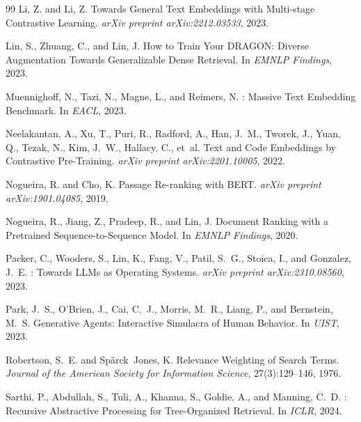 \documentclass[11pt]{article}
\begin{document}
\begin{thebibliography}{99}
Li, Z. and Li, Z.
\newblock Towards General Text Embeddings with Multi-stage Contrastive Learning.
\newblock \emph{arXiv preprint arXiv:2212.03533}, 2023.

Lin, S., Zhuang, C., and Lin, J.
\newblock How to Train Your {DRAGON}: Diverse Augmentation Towards Generalizable Dense
  Retrieval.
\newblock In \emph{EMNLP Findings}, 2023.

Muennighoff, N., Tazi, N., Magne, L., and Reimers, N.
: Massive Text Embedding Benchmark.
\newblock In \emph{EACL}, 2023.

Neelakantan, A., Xu, T., Puri, R., Radford, A., Han, J.~M., Tworek, J., Yuan, Q.,
  Tezak, N., Kim, J.~W., Hallacy, C., et~al.
\newblock Text and Code Embeddings by Contrastive Pre-Training.
\newblock \emph{arXiv preprint arXiv:2201.10005}, 2022.

Nogueira, R. and Cho, K.
\newblock Passage Re-ranking with {BERT}.
\newblock \emph{arXiv preprint arXiv:1901.04085}, 2019.

Nogueira, R., Jiang, Z., Pradeep, R., and Lin, J.
\newblock Document Ranking with a Pretrained Sequence-to-Sequence Model.
\newblock In \emph{EMNLP Findings}, 2020.

Packer, C., Wooders, S., Lin, K., Fang, V., Patil, S.~G., Stoica, I., and
  Gonzalez, J.~E.
: Towards {LLM}s as Operating Systems.
\newblock \emph{arXiv preprint arXiv:2310.08560}, 2023.

Park, J.~S., O'Brien, J., Cai, C.~J., Morris, M.~R., Liang, P., and Bernstein, M.~S.
\newblock Generative Agents: Interactive Simulacra of Human Behavior.
\newblock In \emph{UIST}, 2023.

Robertson, S.~E. and Sp{\"a}rck~Jones, K.
\newblock Relevance Weighting of Search Terms.
\newblock \emph{Journal of the American Society for Information Science},
  27(3):129--146, 1976.

Sarthi, P., Abdullah, S., Tuli, A., Khanna, S., Goldie, A., and Manning, C.~D.
: Recursive Abstractive Processing for Tree-Organized Retrieval.
\newblock In \emph{ICLR}, 2024.


\end{thebibliography}
\end{document}
